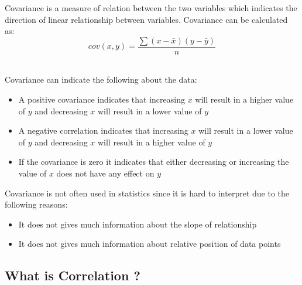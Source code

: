 \documentclass[twoside,12pt]{report}  %
\begin{document}
\begin{tcolorbox}[colback=red!5!white, colframe=red!75!black, title = \textbf{Covariance}]
	Covariance is a measure of relation between the two variables which indicates the direction of linear relationship between variables. Covariance can be calculated as:
	$$ \boxed{cov(x,y) = \frac{\sum(x-\bar{x})(y-\bar{y})}{n}}$$
\end{tcolorbox}
\noindent
\\
Covariance can indicate the following about the data:
\begin{itemize}
	\item A positive covariance indicates that increasing $x$ will result in a higher value of $y$ and decreasing $x$ will result in a lower value of $y$
	\item A negative correlation indicates that increasing $x$ will result in a lower value of $y$ and decreasing $x$ will result in a higher value of $y$
	\item If the covariance is zero it indicates that either decreasing or increasing the value of $x$ does not have any effect on $y$
\end{itemize}
\noindent
Covariance is not often used in statistics since it is hard to interpret due to the following reasons:
\begin{itemize}
	\item It does not gives much information about the slope of relationship
	\item It does not gives much information about relative position of data points
\end{itemize}

\subsection{What is Correlation ?}
\end{document}
